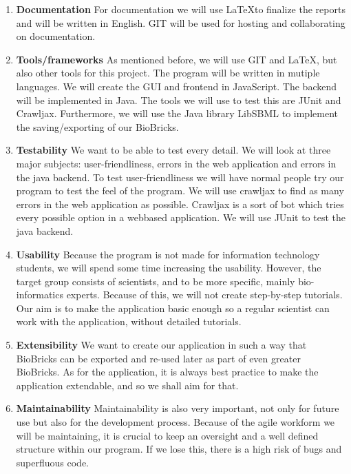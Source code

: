\documentclass[a4paper]{article}
\begin{document}
\begin{enumerate}
\item \textbf{Documentation} For documentation we will use \LaTeX  to finalize the reports and will be written in English. GIT will be used for hosting and collaborating on documentation.
\item \textbf{Tools/frameworks} As mentioned before, we will use GIT and \LaTeX, but also other tools for this project. The program will be written in mutiple languages. We will create the GUI and frontend in JavaScript. The backend will be implemented in Java. The tools we will use to test this are JUnit and Crawljax. Furthermore, we will use the Java library LibSBML to implement the saving/exporting of our BioBricks.
\item \textbf{Testability} We want to be able to test every detail. We will look at three major subjects: user-friendliness, errors in the web application and errors in the java backend. To test user-friendliness we will have normal people try our program to test the feel of the program. We will use crawljax to find as many errors in the web application as possible. Crawljax is a sort of bot which tries every possible option in a webbased application. We will use JUnit to test the java backend.

\item \textbf{Usability} Because the program is not made for information technology students, we will spend some time increasing the usability. However, the target group consists of scientists, and to be more specific, mainly bio-informatics experts. Because of this, we will not create step-by-step tutorials. Our aim is to make the application basic enough so a regular scientist can work with the application, without detailed tutorials.

\item \textbf{Extensibility} We want to create our application in such a way that BioBricks can be exported and re-used later as part of even greater BioBricks. As for the application, it is always best practice to make the application extendable, and so we shall aim for that.

\item \textbf{Maintainability} Maintainability is also very important, not only for future use but also for the development process. Because of the agile workform we will be maintaining, it is crucial to keep an oversight and a well defined structure within our program. If we lose this, there is a high risk of bugs and superfluous code.


\end{enumerate}
\end{document}
